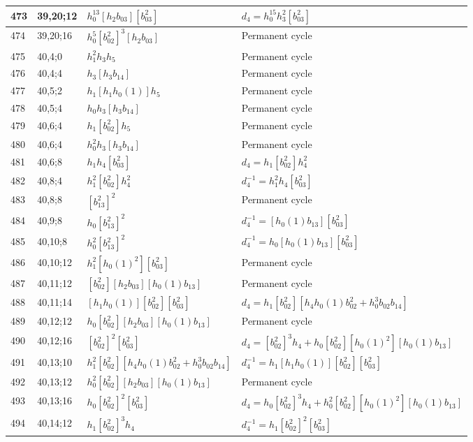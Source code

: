 \documentclass{article}
\begin{document}
\begin{longtable}{|l|l|>{\raggedright\arraybackslash}p{6cm}|>{\raggedright\arraybackslash}p{6cm}|}
473 & 39,20;12 & $h_0^{13}[h_2b_{03}][b_{03}^2]$ &$d_{4}=h_0^{15}h_3^2[b_{03}^2]$\\
\hline
474 & 39,20;16 & $h_0^5[b_{02}^2]^3[h_2b_{03}]$ & Permanent cycle\\
\hline
475 & 40,4;0 & $h_1^2h_3h_5$ & Permanent cycle\\
\hline
476 & 40,4;4 & $h_3[h_3b_{14}]$ & Permanent cycle\\
\hline
477 & 40,5;2 & $h_1[h_1h_0(1)]h_5$ & Permanent cycle\\
\hline
478 & 40,5;4 & $h_0h_3[h_3b_{14}]$ & Permanent cycle\\
\hline
479 & 40,6;4 & $h_1[b_{02}^2]h_5$ & Permanent cycle\\
480 & 40,6;4 & $h_0^2h_3[h_3b_{14}]$ & Permanent cycle\\
\hline
481 & 40,6;8 & $h_1h_4[b_{03}^2]$ &$d_{4}=h_1[b_{02}^2]h_4^2$\\
\hline
482 & 40,8;4 & $h_1^2[b_{02}^2]h_4^2$ & $d_{4}^{-1}=h_1^2h_4[b_{03}^2]$\\
\hline
483 & 40,8;8 & $[b_{13}^2]^2$ & Permanent cycle\\
\hline
484 & 40,9;8 & $h_0[b_{13}^2]^2$ & $d_{4}^{-1}=[h_0(1)b_{13}][b_{03}^2]$\\
\hline
485 & 40,10;8 & $h_0^2[b_{13}^2]^2$ & $d_{4}^{-1}=h_0[h_0(1)b_{13}][b_{03}^2]$\\
\hline
486 & 40,10;12 & $h_1^2[h_0(1)^2][b_{03}^2]$ & Permanent cycle\\
\hline
487 & 40,11;12 & $[b_{02}^2][h_2b_{03}][h_0(1)b_{13}]$ & Permanent cycle\\
\hline
488 & 40,11;14 & $[h_1h_0(1)][b_{02}^2][b_{03}^2]$ &$d_{4}=h_1[b_{02}^2][h_4h_0(1)b_{02}^2 + h_0^3b_{02}b_{14}]$\\
\hline
489 & 40,12;12 & $h_0[b_{02}^2][h_2b_{03}][h_0(1)b_{13}]$ & Permanent cycle\\
\hline
490 & 40,12;16 & $[b_{02}^2]^2[b_{03}^2]$ &$d_{4}=[b_{02}^2]^3h_4 + h_0[b_{02}^2][h_0(1)^2][h_0(1)b_{13}]$\\
\hline
491 & 40,13;10 & $h_1^2[b_{02}^2][h_4h_0(1)b_{02}^2 + h_0^3b_{02}b_{14}]$ & $d_{4}^{-1}=h_1[h_1h_0(1)][b_{02}^2][b_{03}^2]$\\
\hline
492 & 40,13;12 & $h_0^2[b_{02}^2][h_2b_{03}][h_0(1)b_{13}]$ & Permanent cycle\\
\hline
493 & 40,13;16 & $h_0[b_{02}^2]^2[b_{03}^2]$ &$d_{4}=h_0[b_{02}^2]^3h_4 + h_0^2[b_{02}^2][h_0(1)^2][h_0(1)b_{13}]$\\
\hline
494 & 40,14;12 & $h_1[b_{02}^2]^3h_4$ & $d_{4}^{-1}=h_1[b_{02}^2]^2[b_{03}^2]$\\

\end{longtable}
\end{document}
